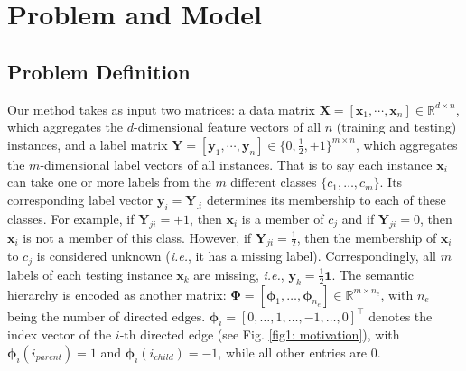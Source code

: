 \documentclass[twocolumn]{svjour3}          %
\newcommand{\x}{\mathbf{x}}
\newcommand{\y}{\mathbf{y}}
\begin{document}
\section{Problem and Model}
\label{sec: 3 model}

\subsection{Problem Definition}
\label{sec: 3 subsec problem definition}
Our method takes as input two matrices: a data matrix $\mathbf{X} = [\x_1,\cdots,\x_n] \in \mathbb{R}^{d \times n}$, which aggregates the $d$-dimensional feature vectors of all $n$ (training and testing) instances, and a label matrix $\mathbf{Y} = [\y_1,\cdots,\y_n] \in \{0,\frac{1}{2},+1\}^{m \times n}$, which aggregates the $m$-dimensional label vectors of all instances. That is to say each instance $\x_i$ can take one or more labels from the  $m$ different classes $\{c_1,\ldots,c_m\}$. Its corresponding label vector $\y_i=\mathbf{Y}_{.i}$ determines its membership to each of these classes. For example, if $\mathbf{Y}_{ji} = +1$, then $\x_i$ is a member of $c_j$ and if $\mathbf{Y}_{ji} = 0$, then $\x_i$ is not a member of this class. However, if  $\mathbf{Y}_{ji} = \frac{1}{2}$, then the membership of $\x_i$ to $c_j$ is considered unknown ({\it i.e.}, it has a missing label). Correspondingly, all $m$ labels of each testing instance $\x_k$ are missing, {\it i.e.}, $\y_k=\frac{1}{2}\mathbf{1}$.
%
The semantic hierarchy is encoded as another matrix: $\mathbf{\Phi} = [\boldsymbol{\phi}_1, \ldots, \boldsymbol{\phi}_{n_e}] \in \mathbb{R}^{m \times n_e}$, with $n_e$ being the number of directed edges.
$\boldsymbol{\phi}_i = [0, \ldots, 1, \ldots, -1, \ldots, 0]^\top$ denotes the index vector of the $i$-th directed edge (see Fig. \ref{fig1: motivation}),
with $\boldsymbol{\phi}_i(i_{parent}) =1$ and $\boldsymbol{\phi}_i(i_{child}) = -1$, while all other entries are 0.
\end{document}
